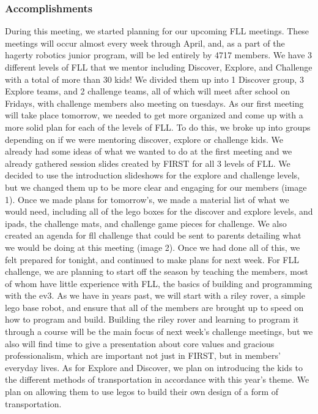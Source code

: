 \subsubsection*{Accomplishments}
During this meeting, we started planning for our upcoming FLL meetings. These meetings will occur almost every week through April, and, as a part of the hagerty robotics junior program, will be led entirely by 4717 members. We have 3 different levels of FLL that we mentor including Discover, Explore, and Challenge with a total of more than 30 kids! We divided them up into 1 Discover group, 3 Explore teams, and 2 challenge teams, all of which will meet after school on Fridays, with challenge members also meeting on tuesdays.
As our first meeting will take place tomorrow, we needed to get more organized and come up with a more solid plan for each of the levels of FLL. To do this, we broke up into groups depending on if we were mentoring discover, explore or challenge kids. We already had some ideas of what we wanted to do at the first meeting and we already gathered session slides created by FIRST for all 3 levels of FLL. We decided to use the introduction slideshows for the explore and challenge levels, but we changed them up to be more clear and engaging for our members (image 1). Once we made plans for tomorrow’s, we made a material list of what we would need, including all of the lego boxes for the discover and explore levels, and ipads, the challenge mats, and challenge game pieces for challenge. We also created an agenda for fll challenge that could be sent to parents detailing what we would be doing at this meeting (image 2). 
Once we had done all of this, we felt prepared for tonight, and continued to make plans for next week. For FLL challenge, we are planning to start off the season by teaching the members, most of whom have little experience with FLL, the basics of building and programming with the ev3. As we have in years past, we will start with a riley rover, a simple lego base robot, and ensure that all of the members are brought up to speed on how to program and build. Building the riley rover and learning to program it through a course will be the main focus of next week’s challenge meetings, but we also will find time to give a presentation about core values and gracious professionalism, which are important not just in FIRST, but in members’ everyday lives. As for Explore and Discover, we plan on introducing the kids to the different methods of transportation in accordance with this year’s theme. We plan on allowing them to use legos to build their own design of a form of transportation.
 

